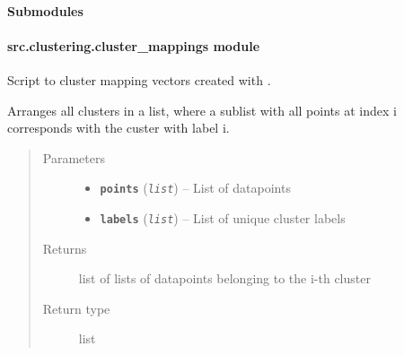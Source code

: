 \documentclass[letterpaper,10pt,english]{sphinxmanual}
\begin{document}
\paragraph{Submodules}
\label{src.clustering:submodules}

\paragraph{src.clustering.cluster\_mappings module}
\label{src.clustering:module-src.clustering.cluster_mappings}\label{src.clustering:src-clustering-cluster-mappings-module}
Script to cluster mapping vectors created with {\hyperref[src.mapping:module\string-src.mapping.mapthreading]{}}.

\begin{fulllineitems}
\label{src.clustering:src.clustering.cluster_mappings.aggregate_cluster}
Arranges all clusters in a list, where a sublist with all points at index i corresponds with the
custer with label i.
\begin{quote}\begin{description}
\item[{Parameters}] \leavevmode\begin{itemize}
\item {} 
\textbf{\texttt{points}} (\emph{\texttt{list}}) -- List of datapoints

\item {} 
\textbf{\texttt{labels}} (\emph{\texttt{list}}) -- List of unique cluster labels

\end{itemize}

\item[{Returns}] \leavevmode
list of lists of datapoints belonging to the i-th cluster

\item[{Return type}] \leavevmode
list

\end{description}\end{quote}

\end{fulllineitems}

\end{document}
